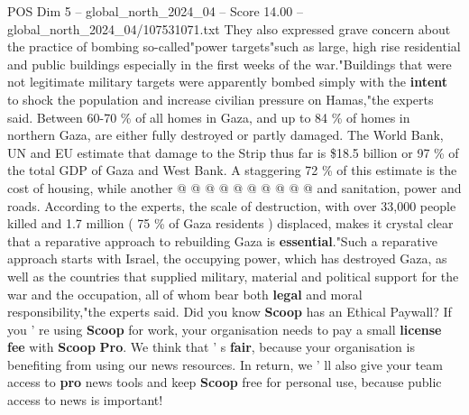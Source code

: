 \begin{textsample}{POS Dim 5 – global\_north\_2024\_04 – Score 14.00 – global\_north\_2024\_04/107531071.txt}
They also expressed grave concern about the practice of bombing so-called"power targets"such as large, high rise residential and public buildings especially in the first weeks of the war."Buildings that were not legitimate military targets were apparently bombed simply with the \textbf{intent} to shock the population and increase civilian pressure on Hamas,"the experts said.
Between 60-70 \% of all homes in Gaza, and up to 84 \% of homes in northern Gaza, are either fully destroyed or partly damaged.
The World Bank, UN and EU estimate that damage to the Strip thus far is \$18.5 billion or 97 \% of the total GDP of Gaza and West Bank.
A staggering 72 \% of this estimate is the cost of housing, while another @ @ @ @ @ @ @ @ @ @ and sanitation, power and roads.
According to the experts, the scale of destruction, with over 33,000 people killed and 1.7 million ( 75 \% of Gaza residents ) displaced, makes it crystal clear that a reparative approach to rebuilding Gaza is \textbf{essential}."Such a reparative approach starts with Israel, the occupying power, which has destroyed Gaza, as well as the countries that supplied military, material and political support for the war and the occupation, all of whom bear both \textbf{legal} and moral responsibility,"the experts said.
Did you know \textbf{Scoop} has an Ethical Paywall?
If you ' re using \textbf{Scoop} for work, your organisation needs to pay a small \textbf{license} \textbf{fee} with \textbf{Scoop} \textbf{Pro}.
We think that ' s \textbf{fair}, because your organisation is benefiting from using our news resources.
In return, we ' ll also give your team access to \textbf{pro} news tools and keep \textbf{Scoop} free for personal use, because public access to news is important!

\end{textsample}
